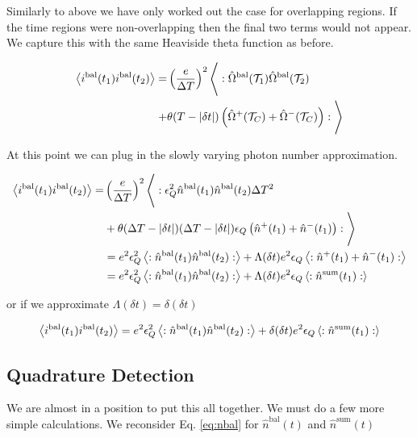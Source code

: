 \documentclass[12pt]{article}
\newcommand{\ep}{\epsilon}
\newcommand{\mc}[1]{\mathcal{#1}}
\begin{document}
Similarly to above we have only worked out the case for overlapping regions. If the time regions were non-overlapping then the final two terms would not appear. We capture this with the same Heaviside theta function as before.

\begin{align}
\Braket{i^{\text{bal}}(t_1)i^{\text{bal}}(t_2)} =& 
\left(\frac{e}{\Delta T}\right)^2 \Bigg \langle: \hat{\Omega}^{\text{bal}}(\mc{T}_1) \hat{\Omega}^{\text{bal}}(\mc{T}_2)\\
+&\theta(T-|\delta t|)\left(\hat{\Omega}^+(\mc{T}_C) + \hat{\Omega}^-(\mc{T}_C)\right)
:\Bigg \rangle
\end{align}

At this point we can plug in the slowly varying photon number approximation.

\begin{align}
\Braket{i^{\text{bal}}(t_1)i^{\text{bal}}(t_2)} = &\left(\frac{e}{\Delta T}\right)^2 \Bigg \langle: \ep_Q^2 \hat{n}^{\text{bal}}(t_1) \hat{n}^{\text{bal}}(t_2) \Delta T^2\\
&+\theta(\Delta T-|\delta t|)(\Delta T-|\delta t|)\ep_Q\left( \hat{n}^+(t_1) + \hat{n}^-(t_1)\right) :\Bigg \rangle\\
&=  e^2\ep_Q^2 \Braket{:\hat{n}^{\text{bal}}(t_1) \hat{n}^{\text{bal}}(t_2) :} + \Lambda(\delta t)e^2\ep_Q \Braket{: \hat{n}^+(t_1) + \hat{n}^-(t_1):}\\
&=  e^2\ep_Q^2 \Braket{:\hat{n}^{\text{bal}}(t_1) \hat{n}^{\text{bal}}(t_2) :} + \Lambda(\delta t)e^2\ep_Q \Braket{: \hat{n}^{\text{sum}}(t_1):}\\
\end{align}

or if we approximate $\Lambda(\delta t) = \delta(\delta t)$

\begin{align}
\label{balcurrent}
\Braket{i^{\text{bal}}(t_1)i^{\text{bal}}(t_2)} = e^2\ep_Q^2 \Braket{:\hat{n}^{\text{bal}}(t_1) \hat{n}^{\text{bal}}(t_2) :} + \delta(\delta t)e^2\ep_Q \Braket{: \hat{n}^{\text{sum}}(t_1):}\\
\end{align}


\subsection{Quadrature Detection}

We are almost in a position to put this all together. We must do a few more simple calculations. We reconsider Eq. \eqref{eq:nbal} for $\hat{n}^{\text{bal}}(t)$ and $\hat{n}^{\text{sum}}(t)$
\end{document}
